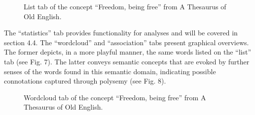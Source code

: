 \begin{figure}[htbp]
	\caption[]{\label{fig:Stolk2021a:Fig6} List tab of the concept “Freedom, being free” from A Thesaurus of Old English.}
\end{figure}


The “statistics” tab provides functionality for analyses and will be covered in section 4.4. The “wordcloud” and “association” tabs present graphical overviews. The former depicts, in a more playful manner, the same words listed on the “list” tab (see Fig. 7). The latter conveys semantic concepts that are evoked by further senses of the words found in this semantic domain, indicating possible connotations captured through polysemy (see Fig. 8).

\begin{figure}[htbp]
	\caption[]{\label{fig:Stolk2021a:Fig7} Wordcloud tab of the concept “Freedom, being free” from A Thesaurus of Old English.}
\end{figure}

